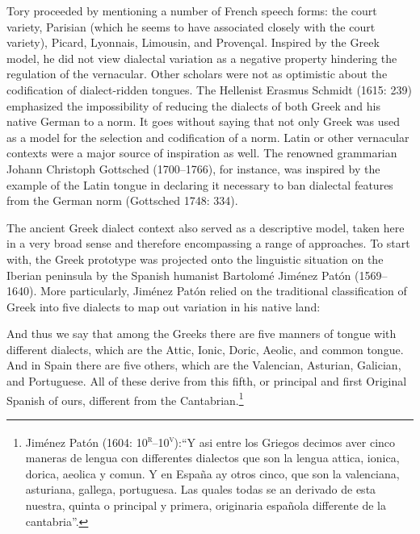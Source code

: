 \documentclass[12pt]{article}
\newenvironment{styleStandard}{\renewcommand\baselinestretch{1.25}\setlength\leftskip{0in}\setlength\rightskip{0in}\setlength\parindent{0.1972in}\setlength\parfillskip{0pt plus 1fil}\setlength\parskip{0in plus 1pt}\writerlistparindent\writerlistleftskip\leavevmode\normalfont\normalsize\writerlistlabel\ignorespaces}{\unskip\vspace{0in plus 1pt}\par}
\newenvironment{styleQuote}{\renewcommand\baselinestretch{1.25}\setlength\leftskip{0.3937in}\setlength\rightskip{0in}\setlength\parindent{0in}\setlength\parfillskip{0pt plus 1fil}\setlength\parskip{0.1665in plus 0.016649999in}\writerlistparindent\writerlistleftskip\leavevmode\normalfont\normalsize\writerlistlabel\ignorespaces}{\unskip\vspace{0.1665in plus 0.016649999in}\par}
\newcommand\writerlistleftskip{}
\newcommand\writerlistparindent{}
\newcommand\writerlistlabel{}
\begin{document}
\begin{styleStandard}
Tory proceeded by mentioning a number of French speech forms: the court variety, Parisian (which he seems to have associated closely with the court variety), Picard, Lyonnais, Limousin, and Provençal. Inspired by the Greek model, he did not view dialectal variation as a negative property hindering the regulation of the vernacular. Other scholars were not as optimistic about the codification of dialect-ridden tongues. The Hellenist Erasmus Schmidt (1615: 239) emphasized the impossibility of reducing the dialects of both Greek and his native German to a norm. It goes without saying that not only Greek was used as a model for the selection and codification of a norm. Latin or other vernacular contexts were a major source of inspiration as well. The renowned grammarian Johann Christoph Gottsched (1700–1766), for instance, was inspired by the example of the Latin tongue in declaring it necessary to ban dialectal features from the German norm (Gottsched 1748: 334).
\end{styleStandard}

\begin{styleStandard}
The ancient Greek dialect context also served as a descriptive model, taken here in a very broad sense and therefore encompassing a range of approaches. To start with, the Greek prototype was projected onto the linguistic situation on the Iberian peninsula by the Spanish humanist Bartolomé Jiménez Patón (1569–1640). More particularly, Jiménez Patón relied on the traditional classification of Greek into five dialects to map out variation in his native land:
\end{styleStandard}

\begin{styleQuote}
And thus we say that among the Greeks there are five manners of tongue with different dialects, which are the Attic, Ionic, Doric, Aeolic, and common tongue. And in Spain there are five others, which are the Valencian, Asturian, Galician, and Portuguese. All of these derive from this fifth, or principal and first Original Spanish of ours, different from the Cantabrian.\footnote{ Jiménez Patón (1604: 10\textsc{\textsuperscript{r}}\textsc{–10}\textsc{\textsuperscript{v}}):“Y asi entre los Griegos decimos aver cinco maneras de lengua con differentes dialectos que son la lengua attica, ionica, dorica, aeolica y comun. Y en España ay otros cinco, que son la valenciana, asturiana, gallega, portuguesa. Las quales todas se an derivado de esta nuestra, quinta o principal y primera, originaria española differente de la cantabria”.}
\end{styleQuote}
\end{document}
